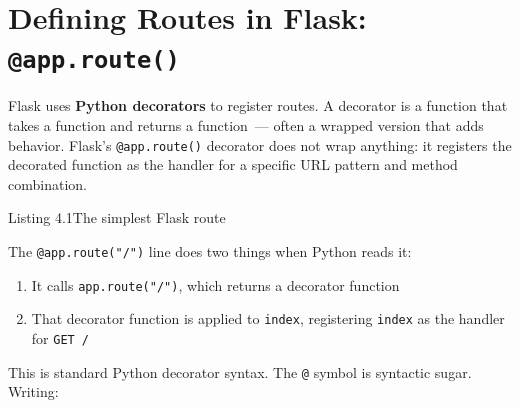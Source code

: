 \setcounter{section}{1}
\section{\texorpdfstring{Defining Routes in Flask: \texttt{@app.route()}}{Defining Routes in Flask: @app.route()}}\label{04-request-handling-paths:42-defining-routes-in-flask-approute}

Flask uses \textbf{Python decorators} to register routes. A decorator is a function that takes a function and returns a function~--- often a wrapped version that adds behavior. Flask's \texttt{@app.route()} decorator does not wrap anything: it registers the decorated function as the handler for a specific URL pattern and method combination.

\begin{codeboxcap}[short]{\textcolor{accent}{Listing 4.1}\enspace The simplest Flask route}

\begin{Shaded}
\begin{Highlighting}[]

\OperatorTok{=}\NormalTok{)}

\NormalTok{(}\NormalTok{)}
     
\end{Highlighting}
\end{Shaded}

\end{codeboxcap}

\noindent{}The \texttt{@app.route("/")} line does two things when Python reads it:

\begin{enumerate}
\def\labelenumi{\arabic{enumi}.}
\tightlist
\item
  It calls \texttt{app.route("/")}, which returns a decorator function
\item
  That decorator function is applied to \texttt{index}, registering \texttt{index} as the handler for \texttt{GET\ /}
\end{enumerate}

\noindent{}This is standard Python decorator syntax. The \texttt{@} symbol is syntactic sugar. Writing:

\begin{codebox}[short]

\begin{Shaded}
\begin{Highlighting}[]
\NormalTok{(}\NormalTok{)}
     
\end{Highlighting}
\end{Shaded}

\end{codebox}

